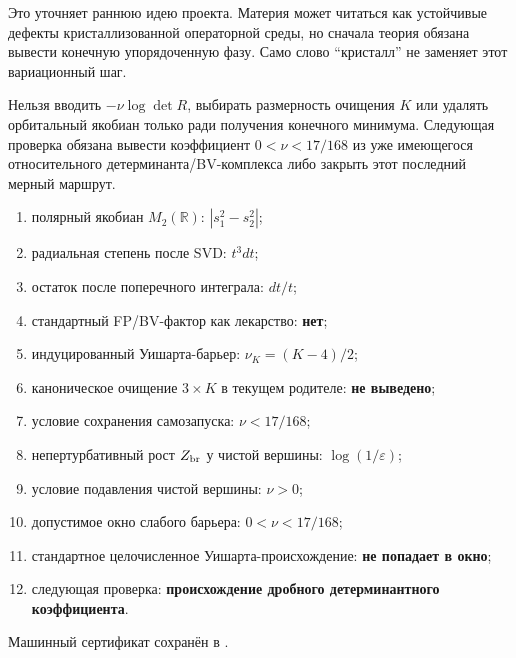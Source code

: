 Это уточняет раннюю идею проекта. Материя может читаться как устойчивые
дефекты кристаллизованной операторной среды, но сначала теория обязана
вывести конечную упорядоченную фазу. Само слово ``кристалл'' не заменяет
этот вариационный шаг.

\begin{nogocriterion}
Нельзя вводить $-\nu\log\det R$, выбирать размерность очищения $K$ или
удалять орбитальный якобиан только ради получения конечного минимума.
Следующая проверка обязана вывести коэффициент $0<\nu<17/168$ из уже имеющегося
относительного детерминанта/BV-комплекса либо закрыть этот последний мерный
маршрут.
\end{nogocriterion}

\begin{protocol}
\begin{enumerate}
 \item полярный якобиан $M_2(\mathbb R)$:
 \textbf{$|s_1^2-s_2^2|$};
 \item радиальная степень после SVD: \textbf{$t^3dt$};
 \item остаток после поперечного интеграла: \textbf{$dt/t$};
 \item стандартный FP/BV-фактор как лекарство: \textbf{нет};
 \item индуцированный Уишарта-барьер:
 \textbf{$\nu_K=(K-4)/2$};
 \item каноническое очищение $3\times K$ в текущем родителе:
 \textbf{не выведено};
 \item условие сохранения самозапуска:
 \textbf{$\nu<17/168$};
 \item непертурбативный рост $Z_{\rm br}$ у чистой вершины:
 \textbf{$\log(1/\varepsilon)$};
 \item условие подавления чистой вершины:
 \textbf{$\nu>0$};
 \item допустимое окно слабого барьера:
 \textbf{$0<\nu<17/168$};
 \item стандартное целочисленное Уишарта-происхождение:
 \textbf{не попадает в окно};
 \item следующая проверка:
 \textbf{происхождение дробного детерминантного коэффициента}.
\end{enumerate}
\end{protocol}

Машинный сертификат сохранён в
.